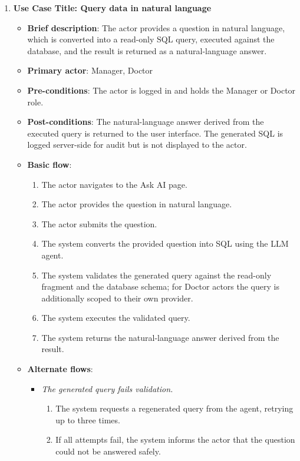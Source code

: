 \begin{enumerate}
\vspace{0.5em}

\item \textbf{Use Case Title: Query data in natural language}
\begin{itemize}
    \item \textbf{Brief description}: The actor provides a question in natural language, which is converted into a read-only SQL query, executed against the database, and the result is returned as a natural-language answer.
    \item \textbf{Primary actor}: Manager, Doctor
    \item \textbf{Pre-conditions}: The actor is logged in and holds the Manager or Doctor role.
    \item \textbf{Post-conditions}: The natural-language answer derived from the executed query is returned to the user interface. The generated SQL is logged server-side for audit but is not displayed to the actor.
    \item \textbf{Basic flow}:
    \begin{enumerate}
        \item The actor navigates to the Ask AI page.
        \item The actor provides the question in natural language.
        \item The actor submits the question.
        \item The system converts the provided question into SQL using the LLM agent.
        \item The system validates the generated query against the read-only fragment and the database schema; for Doctor actors the query is additionally scoped to their own provider.
        \item The system executes the validated query.
        \item The system returns the natural-language answer derived from the result.
    \end{enumerate}
    \item \textbf{Alternate flows}:
    \begin{itemize}
        \item[5a.] \textit{The generated query fails validation.}
        \begin{enumerate}
            \item The system requests a regenerated query from the agent, retrying up to three times.
            \item If all attempts fail, the system informs the actor that the question could not be answered safely.
        \end{enumerate}
    \end{itemize}
\end{itemize}


\end{enumerate}
